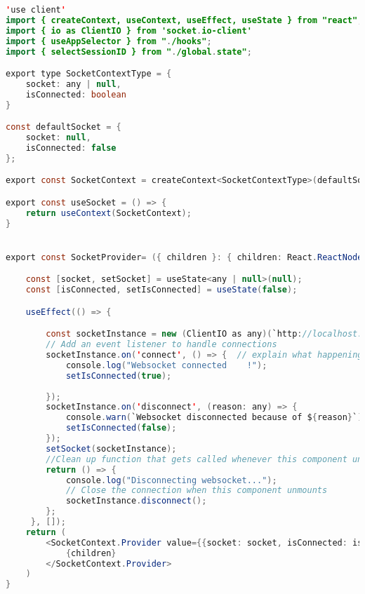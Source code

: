 \begin{lstlisting}[language=Java, caption={Socket Provider Component}, label={lst:java}]
'use client'
import { createContext, useContext, useEffect, useState } from "react";
import { io as ClientIO } from 'socket.io-client'
import { useAppSelector } from "./hooks";
import { selectSessionID } from "./global.state";

export type SocketContextType = {
    socket: any | null,
    isConnected: boolean
}

const defaultSocket = {
    socket: null,
    isConnected: false
};

export const SocketContext = createContext<SocketContextType>(defaultSocket);

export const useSocket = () => {
    return useContext(SocketContext);
}


export const SocketProvider= ({ children }: { children: React.ReactNode }) => {

    const [socket, setSocket] = useState<any | null>(null);
    const [isConnected, setIsConnected] = useState(false);

    useEffect(() => {

        const socketInstance = new (ClientIO as any)(`http://localhost:5050`); // 
        // Add an event listener to handle connections
        socketInstance.on('connect', () => {  // explain what happening here
            console.log("Websocket connected    !");
            setIsConnected(true);
            
        });
        socketInstance.on('disconnect', (reason: any) => {
            console.warn(`Websocket disconnected because of ${reason}`);
            setIsConnected(false);
        });
        setSocket(socketInstance);
        //Clean up function that gets called whenever this component unmounts
        return () => {
            console.log("Disconnecting websocket...");
            // Close the connection when this component unmounts
            socketInstance.disconnect();
        };
     }, []);
    return (
        <SocketContext.Provider value={{socket: socket, isConnected: isConnected}}>
            {children}
        </SocketContext.Provider>
    )
}
\end{lstlisting}
